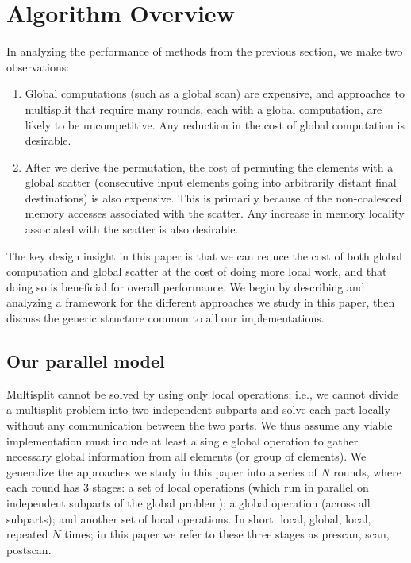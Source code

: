 \section{Algorithm Overview}\label{sec:algorithm}

In analyzing the performance of methods from the previous section, we make two observations:

\begin{enumerate}
\item Global computations (such as a global scan) are expensive, and approaches to multisplit that require many rounds, each with a global computation, are likely to be uncompetitive. Any reduction in the cost of global computation is desirable.
\item After we derive the permutation, the cost of permuting the elements with a global scatter (consecutive input elements going into arbitrarily distant final destinations) is also expensive.
This is primarily because of the non-coalesced memory accesses associated with the scatter. Any increase in memory locality associated with the scatter is also desirable.
\end{enumerate}

The key design insight in this paper is that we can reduce the cost of both global computation and global scatter at the cost of doing more local work, and that doing so is beneficial for overall performance. We begin by describing and analyzing a framework for the different approaches we study in this paper, then discuss the generic structure common to all our implementations.

\subsection{Our parallel model}\label{subsec:parallel_model}
Multisplit cannot be solved by using only local operations; i.e., we cannot divide a multisplit problem into two independent subparts and solve each part locally without any communication between the two parts. We thus assume any viable implementation must include at least a single global operation to gather necessary global information from all elements (or group of elements).
We generalize the approaches we study in this paper into a series of $N$ rounds, where each round has 3 stages: a set of local operations (which run in parallel on independent subparts of the global problem); a global operation (across all subparts); and another set of local operations. In short: \textbraceleft local, global, local\textbraceright, repeated $N$ times; in this paper we refer to these three stages as \textbraceleft prescan, scan, postscan\textbraceright.

